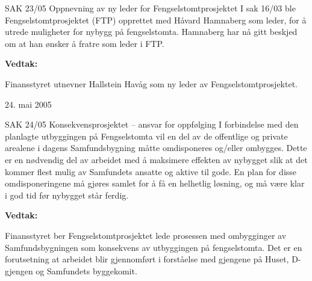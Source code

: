 \begin{instruksledd}{SAK 23/05 Oppnevning av ny leder for Fengselstomtprosjektet}
    I sak 16/03 ble Fengselstomtprosjektet (FTP) opprettet med Håvard Hamnaberg som leder,
    for å utrede muligheter for
    nybygg på fengselstomta. Hamnaberg har nå gitt beskjed om at han ønsker å fratre som
    leder i FTP.

    \textbf{Vedtak:}

    Finansstyret utnevner Hallstein Havåg som ny leder av Fengselstomtprosjektet.
    
    24. mai 2005
\end{instruksledd}

\begin{instruksledd}{SAK 24/05 Konsekvensprosjektet – ansvar for oppfølging}
    I forbindelse med den planlagte utbyggingen på Fengselstomta vil en del av de
    offentlige og private arealene i dagens
    Samfundsbygning måtte omdisponeres og/eller ombygges. Dette er en nødvendig del av
    arbeidet med å maksimere
    effekten av nybygget slik at det kommer flest mulig av Samfundets ansatte og aktive
    til gode. En plan for disse
    omdisponeringene må gjøres samlet for å få en helhetlig løsning, og må være klar i god
    tid før nybygget står ferdig.

    \textbf{Vedtak:}

    Finansstyret ber Fengselstomtprosjektet lede prosessen med ombygginger av
    Samfundsbygningen som konsekvens av
    utbyggingen på fengselstomta. Det er en forutsetning at arbeidet blir gjennomført i
    forståelse med gjengene på Huset, D-gjengen og Samfundets byggekomit.
\end{instruksledd}
\pagebreak






